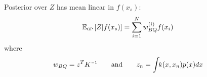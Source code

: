 \documentclass[usenames,dvipsnames]{beamer}
\begin{document}
\begin{frame}[plain, t]
{\begin{itemize}
			\end{itemize}   		
	}
\end{frame}



\begin{frame}[plain, t]
	\titlebodyskip

Posterior over $Z$ has mean linear in $f(x_s)$:
\begin{align*}
\expectargs{\gp}{Z|f(x_s)} %
  & = \sum_{i=1}^N w_{\small{BQ}}^{(i)} \vf(\vx_i)
  \end{align*}
  where
  \begin{align*} 
 w_{\small{BQ}} & = \vz^T K\inv \qquad \textrm{and} \qquad z_n = \int\!\! k(\vx, \vx_n) p(\vx) d\vx
\end{align*} 

\end{frame}
\end{document}
